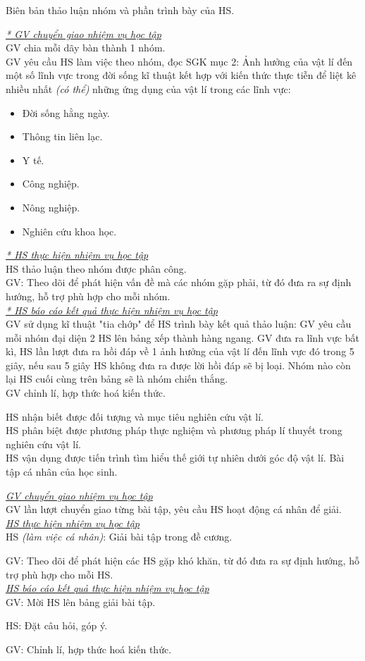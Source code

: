{Biên bản thảo luận nhóm và phần trình bày của HS.

}
{
	\textit{\underline{
* GV chuyển giao nhiệm vụ học tập	
}}\\
GV chia mỗi dãy bàn thành 1 nhóm.\\
GV yêu cầu HS làm việc theo nhóm, đọc SGK mục 2: Ảnh hưởng của vật lí đến một số lĩnh vực trong đời sống kĩ thuật kết hợp với kiến thức thực tiễn để liệt kê nhiều nhất \textit{(có thể)} những ứng dụng của vật lí trong các lĩnh vực:
\begin{itemize}
	\item Đời sống hằng ngày.
	\item Thông tin liên lạc.
	\item Y tế.
	\item Công nghiệp.
	\item Nông nghiệp.
	\item Nghiên cứu khoa học.
\end{itemize}
\textit{\underline{
* HS thực hiện nhiệm vụ học tập
}}\\
HS thảo luận theo nhóm được phân công.\\
GV: Theo dõi để phát hiện vấn đề mà các nhóm gặp phải, từ đó đưa ra sự định hướng, hỗ trợ phù hợp cho mỗi nhóm.\\
\textit{\underline{
		* HS báo cáo kết quả thực hiện nhiệm vụ học tập
}}\\
GV sử dụng kĩ thuật "tia chớp" để HS trình bày kết quả thảo luận: GV yêu cầu mỗi nhóm đại diện 2 HS lên bảng xếp thành hàng ngang. GV đưa ra lĩnh vực bất kì, HS lần lượt đưa ra hồi đáp về 1 ảnh hưởng của vật lí đến lĩnh vực đó trong 5 giây, nếu sau 5 giây HS không đưa ra được lời hồi đáp sẽ bị loại. Nhóm nào còn lại HS cuối cùng trên bảng sẽ là nhóm chiến thắng.\\
GV chỉnh lí, hợp thức hoá kiến thức.
}
{ HS nhận biết được đối tượng và mục tiêu nghiên cứu vật lí.\\
	HS phân biệt được phương pháp thực nghiệm và phương pháp lí thuyết trong nghiên cứu vật lí.\\
	HS vận dụng được tiến trình tìm hiểu thế giới tự nhiên dưới góc độ vật lí.
}
{
	Bài tập cá nhân của học sinh.
}
{
	\textit{\underline{GV chuyển giao nhiệm vụ học tập}}\\
	GV lần lượt chuyển giao từng bài tập, yêu cầu HS hoạt động cá nhân để giải.\\
	\textit{\underline{HS thực hiện nhiệm vụ học tập}}\\
	HS \textit{(làm việc cá nhân)}:  Giải bài tập trong đề cương. 
	
	GV: Theo dõi để phát hiện các HS gặp khó khăn, từ đó đưa ra sự định hướng, hỗ trợ phù hợp cho mỗi HS.\\
	\textit{\underline{HS báo cáo kết quả thực hiện nhiệm vụ học tập}}\\
	GV: Mời HS lên bảng giải bài tập.
	
	HS: Đặt câu hỏi, góp ý.
	
	GV: Chỉnh lí, hợp thức hoá kiến thức.
}

